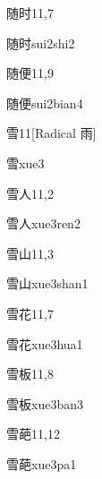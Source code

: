 \begin{entry}{随时}{11,7}
  \begin{phonetics}{随时}{sui2shi2}
  \end{phonetics}
\end{entry}

\begin{entry}{随便}{11,9}
  \begin{phonetics}{随便}{sui2bian4}
  \end{phonetics}
\end{entry}

\begin{entry}{雪}{11}[Radical 雨]
  \begin{phonetics}{雪}{xue3}
  \end{phonetics}
\end{entry}

\begin{entry}{雪人}{11,2}
  \begin{phonetics}{雪人}{xue3ren2}
  \end{phonetics}
\end{entry}

\begin{entry}{雪山}{11,3}
  \begin{phonetics}{雪山}{xue3shan1}
  \end{phonetics}
\end{entry}

\begin{entry}{雪花}{11,7}
  \begin{phonetics}{雪花}{xue3hua1}
  \end{phonetics}
\end{entry}

\begin{entry}{雪板}{11,8}
  \begin{phonetics}{雪板}{xue3ban3}
  \end{phonetics}
\end{entry}

\begin{entry}{雪葩}{11,12}
  \begin{phonetics}{雪葩}{xue3pa1}
  \end{phonetics}
\end{entry}

